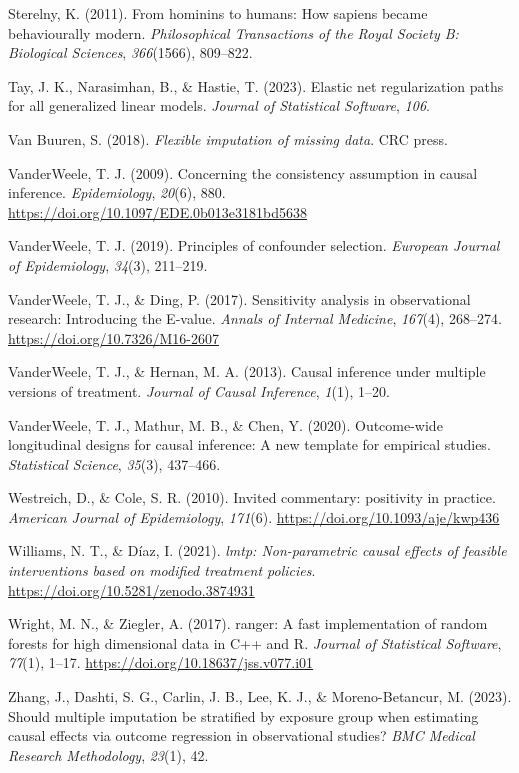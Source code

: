 \documentclass[
  single column]{article}
\newlength{\cslhangindent}
\newenvironment{CSLReferences}[2] %
 {\begin{list}{}{%
  \setlength{\itemindent}{0pt}
  \setlength{\leftmargin}{0pt}
  \setlength{\parsep}{0pt}
  \ifodd #1
   \setlength{\leftmargin}{\cslhangindent}
   \setlength{\itemindent}{-1\cslhangindent}
  \fi
  \setlength{\itemsep}{#2\baselineskip}}}
 {\end{list}}
\begin{document}
\begin{CSLReferences}{1}{0}
Sterelny, K. (2011). From hominins to humans: How sapiens became
behaviourally modern. \emph{Philosophical Transactions of the Royal
Society B: Biological Sciences}, \emph{366}(1566), 809--822.

Tay, J. K., Narasimhan, B., \& Hastie, T. (2023). Elastic net
regularization paths for all generalized linear models. \emph{Journal of
Statistical Software}, \emph{106}.

Van Buuren, S. (2018). \emph{Flexible imputation of missing data}. CRC
press.

VanderWeele, T. J. (2009). Concerning the consistency assumption in
causal inference. \emph{Epidemiology}, \emph{20}(6), 880.
\url{https://doi.org/10.1097/EDE.0b013e3181bd5638}

VanderWeele, T. J. (2019). Principles of confounder selection.
\emph{European Journal of Epidemiology}, \emph{34}(3), 211--219.

VanderWeele, T. J., \& Ding, P. (2017). Sensitivity analysis in
observational research: Introducing the {E}-value. \emph{Annals of
Internal Medicine}, \emph{167}(4), 268--274.
\url{https://doi.org/10.7326/M16-2607}

VanderWeele, T. J., \& Hernan, M. A. (2013). Causal inference under
multiple versions of treatment. \emph{Journal of Causal Inference},
\emph{1}(1), 1--20.

VanderWeele, T. J., Mathur, M. B., \& Chen, Y. (2020). Outcome-wide
longitudinal designs for causal inference: A new template for empirical
studies. \emph{Statistical Science}, \emph{35}(3), 437--466.

Westreich, D., \& Cole, S. R. (2010). Invited commentary: positivity in
practice. \emph{American Journal of Epidemiology}, \emph{171}(6).
\url{https://doi.org/10.1093/aje/kwp436}

Williams, N. T., \& Díaz, I. (2021). \emph{{l}mtp: Non-parametric causal
effects of feasible interventions based on modified treatment policies}.
\url{https://doi.org/10.5281/zenodo.3874931}

Wright, M. N., \& Ziegler, A. (2017). {ranger}: A fast implementation of
random forests for high dimensional data in {C++} and {R}. \emph{Journal
of Statistical Software}, \emph{77}(1), 1--17.
\url{https://doi.org/10.18637/jss.v077.i01}

Zhang, J., Dashti, S. G., Carlin, J. B., Lee, K. J., \& Moreno-Betancur,
M. (2023). Should multiple imputation be stratified by exposure group
when estimating causal effects via outcome regression in observational
studies? \emph{BMC Medical Research Methodology}, \emph{23}(1), 42.

\end{CSLReferences}
\end{document}
